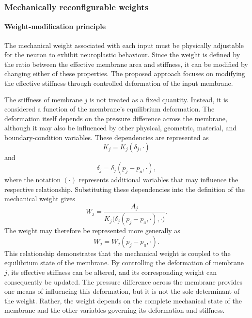 \documentclass[11pt,a4paper]{article}
\numberwithin{equation}{section}
\begin{document}
\subsubsection{Mechanically reconfigurable weights}

\paragraph{Weight-modification principle}

The mechanical weight associated with each input must be physically adjustable for the neuron to exhibit
neuroplastic behaviour. Since the weight is defined by the ratio between the effective membrane area and stiffness,
it can be modified by changing either of these properties. The proposed approach focuses on modifying the effective
stiffness through controlled deformation of the input membrane.

The stiffness of membrane $j$ is not treated as a fixed quantity. Instead, it is considered a function of the
membrane's equilibrium deformation. The deformation itself depends on the pressure difference across the membrane,
although it may also be influenced by other physical, geometric, material, and boundary-condition variables. These
dependencies are represented as
\begin{equation}
  K_j = K_j(\delta_j, \cdot)
  \label{eq:k-of-delta}
\end{equation}
and
\begin{equation}
  \delta_j = \delta_j(p_j - p_a, \cdot),
  \label{eq:delta-of-dp}
\end{equation}
where the notation $(\cdot)$ represents additional variables that may influence the respective relationship.
Substituting these dependencies into the definition of the mechanical weight gives
\begin{equation}
  W_j = \frac{A_j}{K_j\bigl(\delta_j(p_j - p_a, \cdot), \cdot\bigr)} .
  \label{eq:weight-composed}
\end{equation}
The weight may therefore be represented more generally as
\begin{equation}
  W_j = W_j(p_j - p_a, \cdot) .
  \label{eq:weight-state}
\end{equation}
This relationship demonstrates that the mechanical weight is coupled to the equilibrium state of the membrane. By
controlling the deformation of membrane $j$, its effective stiffness can be altered, and its corresponding weight can
consequently be updated. The pressure difference across the membrane provides one means of influencing this
deformation, but it is not the sole determinant of the weight. Rather, the weight depends on the complete mechanical
state of the membrane and the other variables governing its deformation and stiffness.
\end{document}
